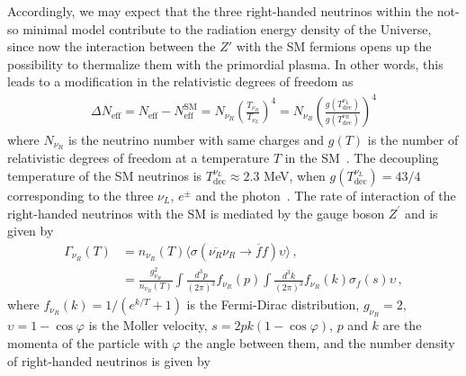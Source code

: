 \documentclass[12pt]{article}
\begin{document}
%




Accordingly, we may expect that 
the three right-handed neutrinos within the not-so minimal model
contribute to the radiation energy density of the Universe, since now   the interaction between the $Z'$ with the SM fermions  opens up the possibility to thermalize them with the primordial plasma.   
In other words, this leads to a modification in the relativistic degrees of freedom as~\cite{Anchordoqui:2012qu,Anchordoqui:2011nh}
%
\begin{align}
    \Delta N_{\text{eff}} = N_{\text{eff}} - N^{\text{SM}}_{\text{eff}} = N_{\nu_R} \left( \frac{T_{\nu_{R}}}{T_{\nu_{L}}} \right)^{4} = N_{\nu_R} \left( \frac{g(T^{\nu_{L}}_{\text{dec}})}{g(T^{\nu_{R}}_{\text{dec}})} \right)^{4}
\end{align}
%
where $N_{\nu_R}$ is the neutrino number with same charges and $g(T)$ is the number of relativistic degrees of freedom at a temperature $T$ in the SM~\cite{Aghanim:2018eyx}. The decoupling temperature of the SM neutrinos is $ T^{\nu_{L}}_{\text{dec}} \approx 2.3 $ MeV, when $g(T^{\nu_{L}}_{ \text{dec}}) = 43/4$ corresponding to the three $\nu_{L}$, $e^{\pm} $ and the photon~\cite{Kolb:1990vq,Enqvist:1991gx}. The rate of interaction of the right-handed neutrinos with the SM is mediated by the gauge boson $Z^{\prime} $ and is given by~\cite{SolagurenBeascoa:2012cz}
%
\begin{align}
    \Gamma_{\nu_R} (T) &= n_{\nu_R}(T) \langle \sigma(\overline{\nu_{R}} \nu_{R} \to \overline{f} f) \upsilon \rangle \,, \nonumber\\
    &= \frac{g^{2}_{\nu_R}}{n_{\nu_R}(T)} \int \frac{d^{3} p}{(2 \pi)^{3}} f_{\nu_R}(p) \int \frac{d^{3} k}{(2 \pi)^{3}} f_{\nu_R}(k) \sigma_{f}(s) \upsilon\,,
\end{align}
%
where $f_{\nu_R}(k)=1/(e^{k/T}+1)$ is the Fermi-Dirac distribution, $g_{\nu_R} = 2$, $\upsilon = 1-\cos{\varphi}$ is the Moller velocity, $s = 2 p k (1-\cos{\varphi})$, $p$ and $k$ are the momenta of the particle with $\varphi$ the angle between them, and the number density of right-handed neutrinos is given by
\end{document}
